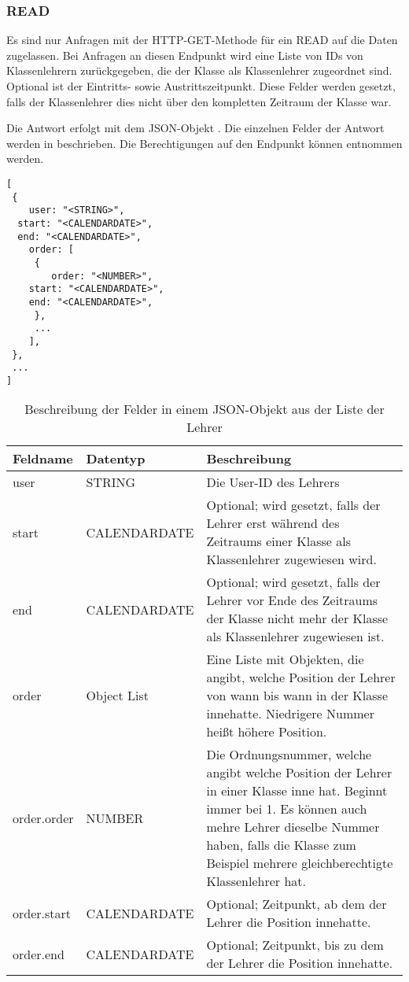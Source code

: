 \subsubsection{READ}
\label{sec:rest:api:classes:id:teachers:read}
Es sind nur Anfragen mit der HTTP-GET-Methode für ein READ auf die Daten zugelassen.
Bei Anfragen an diesen Endpunkt wird eine Liste von IDs von Klassenlehrern zurückgegeben, die der Klasse als Klassenlehrer zugeordnet sind.
Optional ist der Eintritts- sowie Austrittszeitpunkt. Diese Felder werden gesetzt, falls der Klassenlehrer dies nicht über den kompletten Zeitraum der Klasse war.

Die Antwort erfolgt mit dem JSON-Objekt . 
Die einzelnen Felder der Antwort werden in  beschrieben.
Die Berechtigungen auf den Endpunkt können  entnommen werden.

\begin{lstlisting}[caption={JSON-Antwort für einen GET-Aufruf der Route /api/classes/\$id/teachers},label={lst:code:rest:api:classes:id:teachers:read:ret},frame=tlrb]
[ 
 { 
	user: "<STRING>",
  start: "<CALENDARDATE>",
  end: "<CALENDARDATE>",
	order: [
	 {
		order: "<NUMBER>",
    start: "<CALENDARDATE>",
    end: "<CALENDARDATE>",
	 },
	 ...
	],
 },
 ... 
]
\end{lstlisting}

\begin{longtable}{|p{}|p{}|p{}|}
		\caption{Beschreibung der Felder in einem JSON-Objekt aus der Liste der Lehrer}
\endfoot
		\caption{Beschreibung der Felder in einem JSON-Objekt aus der Liste der Lehrer}
		\label{tab:rest:api:classes:id:teachers:read:ret}
\endlastfoot 
\hline
			\textbf{Feldname} & \textbf{Datentyp} & \textbf{Beschreibung} \\ \hline
\endhead
user & STRING & Die User-ID des Lehrers \\ \hline
start & CALENDARDATE & Optional; wird gesetzt, falls der Lehrer erst während des Zeitraums einer Klasse als Klassenlehrer zugewiesen wird. \\ \hline
end & CALENDARDATE & Optional; wird gesetzt, falls der Lehrer vor Ende des Zeitraums der Klasse nicht mehr der Klasse als Klassenlehrer zugewiesen ist. \\ \hline
order & Object List & Eine Liste mit Objekten, die angibt, welche Position der Lehrer von wann bis wann in der Klasse innehatte. Niedrigere Nummer heißt höhere Position. \\ \hline
order.order & NUMBER & Die Ordnungsnummer, welche angibt welche Position der Lehrer in einer Klasse inne hat. Beginnt immer bei 1. Es können auch mehre Lehrer dieselbe Nummer haben, falls die Klasse zum Beispiel mehrere gleichberechtigte Klassenlehrer hat. \\ \hline
order.start & CALENDARDATE & Optional; Zeitpunkt, ab dem der Lehrer die Position innehatte. \\ \hline
order.end & CALENDARDATE & Optional; Zeitpunkt, bis zu dem der Lehrer die Position innehatte. \\ \hline
\end{longtable}


